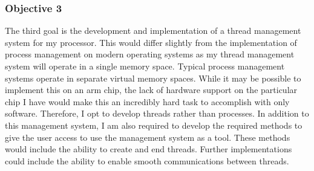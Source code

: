 \subsubsection{Objective 3}
\label{obj3}
The third goal is the development and implementation of a thread management system for my processor. This would differ slightly from the implementation of process management on modern operating systems as my thread management system will operate in a single memory space. Typical process management systems operate in separate virtual memory spaces. While it may be possible to implement this on an arm chip, the lack of hardware support on the particular chip I have would make this an incredibly hard task to accomplish with only software. Therefore, I opt to develop threads rather than processes. In addition to this management system, I am also required to develop the required methods to give the user access to use the management system as a tool. These methods would include the ability to create and end threads. Further implementations could include the ability to enable smooth communications between threads. 